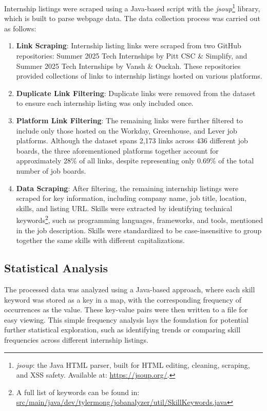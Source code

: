 \documentclass[
	a4paper, %
	10pt, %
	unnumberedsections, %
	twoside, %
]{LTJournalArticle}
\begin{document}
Internship listings were scraped using a Java-based script with the \textit{jsoup}\footnote{\textit{jsoup}: the Java HTML parser, built for HTML editing, cleaning, scraping, and XSS safety. Available at: \url{https://jsoup.org/}.} library, which is built to parse webpage data. The data collection process was carried out as follows:

\begin{enumerate}
    \item \textbf{Link Scraping}: Internship listing links were scraped from two GitHub repositories: Summer 2025 Tech Internships by Pitt CSC \& Simplify, and Summer 2025 Tech Internships by Vansh \& Ouckah. These repositories provided collections of links to internship listings hosted on various platforms.
    \item \textbf{Duplicate Link Filtering}: Duplicate links were removed from the dataset to ensure each internship listing was only included once.
    \item \textbf{Platform Link Filtering}: The remaining links were further filtered to include only those hosted on the Workday, Greenhouse, and Lever job platforms. Although the dataset spans 2,173 links across 436 different job boards, the three aforementioned platforms together account for approximately 28\% of all links, despite representing only 0.69\% of the total number of job boards.
    \item \textbf{Data Scraping}: After filtering, the remaining internship listings were scraped for key information, including company name, job title, location, skills, and listing URL. Skills were extracted by identifying technical keywords\footnote{A full list of keywords can be found in: \url{src/main/java/dev/tylermong/jobanalyzer/util/SkillKeywords.java}}, such as programming languages, frameworks, and tools, mentioned in the job description. Skills were standardized to be case-insensitive to group together the same skills with different capitalizations.
\end{enumerate}
\subsection{Statistical Analysis}
The processed data was analyzed using a Java-based approach, where each skill keyword was stored as a key in a map, with the corresponding frequency of occurrences as the value. These key-value pairs were then written to a file for easy viewing. This simple frequency analysis lays the foundation for potential further statistical exploration, such as identifying trends or comparing skill frequencies across different internship listings.
\end{document}

